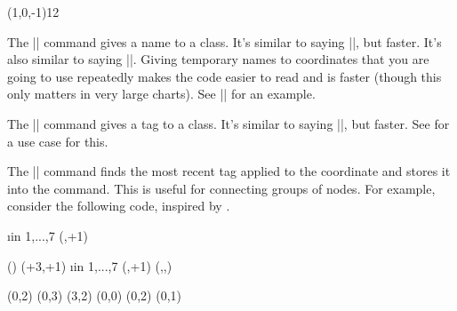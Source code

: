 \begin{sseqdata}[|| name = ex1, cohomological Serre grading]
\begin{command}{\getdtarget{}\pars{\sourcecoord}}
\begin{codeexample}[]
\begin{sseqdata}[ name = cathex, Adams grading, differentials = { blue } ]
(1,0,-1){1}{2}
\end{sseqdata}
\printpage[ name = cathex, page = 1 ]
\qquad
\printpage[ name = cathex, page = 2 ]
\qquad
\printpage[ name = cathex, page = 3 ]
\end{codeexample}
\end{command}

\begin{command}{\nameclass{}}
The |\nameclass| command gives a name to a class. It's similar to saying |\doptions[name = |\meta{name}|]|, but faster. It's also similar to saying |\pushstack|. Giving temporary names to coordinates that you are going to use repeatedly makes the code easier to read and is faster (though this only matters in very large charts). See |\getdtarget| for an example.
\end{command}

\begin{command}{\tagclass{}}
The |\tagclass| command gives a tag to a class. It's similar to saying |\doptions[tag = |\meta{name}|]|, but faster. See  for a use case for this.
\end{command}

\begin{command}{\gettag{}}
The |\gettag| command finds the most recent tag applied to the coordinate and stores it into the command. This is useful for connecting groups of nodes. For example, consider the following code, inspired by .
\begin{codeexample}[width=6cm]
\DeclareSseqCommand {} {
    \begin{scope}[#1]
    \foreach\i in {1,...,7}{
        \class(\lastx,\lasty+1)
        \structline
    }
    \end{scope}
    \restorestack
}
\DeclareSseqCommand {} {
    \begin{scope}[#1]
    \gettag\thetag(\lastclass)
    \class(\lastx+3,\lasty+1)
    \structline[gray]
    \savestack
    \foreach\i in {1,...,7}{
        \class(\lastx,\lasty+1)
        \structline
        \structline[gray](,,\thetag)
    }
    \restorestack
    \end{scope}
}
\begin{sseqpage}[ y range = {0}{6}, x tick step = 3,
    xscale=0.6, yscale=1.3 ]
\class(0,2) \class(0,3) \class(3,2)
\class[tag=h_0^i](0,0)
\tower[tag=h_0^i]
\class(0,2) \class(0,1)


\end{sseqpage}
\end{codeexample}
\end{command}
\end{sseqdata}
